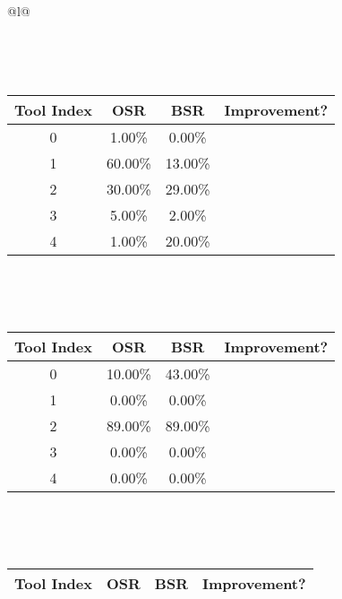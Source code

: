 \begin{longtable}{@{}l@{}}
\begin{minipage}{\textwidth}
\end{minipage}\\[2ex]
\begin{minipage}{\textwidth}
\centering\vspace{2ex}
\\[0.8ex]
\begin{tabular}{|c|c|c|c|} \hline
\textbf{Tool Index} & \textbf{OSR} & \textbf{ BSR} & \textbf{Improvement?} \\ \hline
0 & 1.00\% & 0.00\% & \textcolor{red}{\ding{55}} \\ \hline
1 & 60.00\% & 13.00\% & \textcolor{red}{\ding{55}} \\ \hline
2 & 30.00\% & 29.00\% & \textcolor{red}{\ding{55}} \\ \hline
3 & 5.00\% & 2.00\% & \textcolor{red}{\ding{55}} \\ \hline
4 & 1.00\% & 20.00\% & \textcolor{green}{\ding{51}} \\ \hline
\end{tabular}
\end{minipage}\\[2ex]
\begin{minipage}{\textwidth}
\centering\vspace{2ex}
\\[0.8ex]
\begin{tabular}{|c|c|c|c|} \hline
\textbf{Tool Index} & \textbf{OSR} & \textbf{ BSR} & \textbf{Improvement?} \\ \hline
0 & 10.00\% & 43.00\% & \textcolor{green}{\ding{51}} \\ \hline
1 & 0.00\% & 0.00\% & \textcolor{red}{\ding{55}} \\ \hline
2 & 89.00\% & 89.00\% & \textcolor{red}{\ding{55}} \\ \hline
3 & 0.00\% & 0.00\% & \textcolor{red}{\ding{55}} \\ \hline
4 & 0.00\% & 0.00\% & \textcolor{red}{\ding{55}} \\ \hline
\end{tabular}
\end{minipage}\\[2ex]
\begin{minipage}{\textwidth}
\centering\vspace{2ex}
\\[0.8ex]
\begin{tabular}{|c|c|c|c|} \hline
\textbf{Tool Index} & \textbf{OSR} & \textbf{ BSR} & \textbf{Improvement?} \\ \hline

\end{tabular}
\end{minipage}
\end{longtable}
